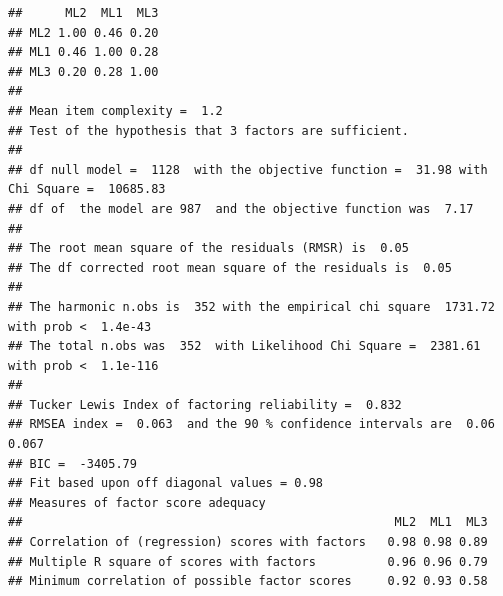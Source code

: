\documentclass[
  man]{apa6}
\begin{document}
\begin{verbatim}
##      ML2  ML1  ML3
## ML2 1.00 0.46 0.20
## ML1 0.46 1.00 0.28
## ML3 0.20 0.28 1.00
## 
## Mean item complexity =  1.2
## Test of the hypothesis that 3 factors are sufficient.
## 
## df null model =  1128  with the objective function =  31.98 with Chi Square =  10685.83
## df of  the model are 987  and the objective function was  7.17 
## 
## The root mean square of the residuals (RMSR) is  0.05 
## The df corrected root mean square of the residuals is  0.05 
## 
## The harmonic n.obs is  352 with the empirical chi square  1731.72  with prob <  1.4e-43 
## The total n.obs was  352  with Likelihood Chi Square =  2381.61  with prob <  1.1e-116 
## 
## Tucker Lewis Index of factoring reliability =  0.832
## RMSEA index =  0.063  and the 90 % confidence intervals are  0.06 0.067
## BIC =  -3405.79
## Fit based upon off diagonal values = 0.98
## Measures of factor score adequacy             
##                                                    ML2  ML1  ML3
## Correlation of (regression) scores with factors   0.98 0.98 0.89
## Multiple R square of scores with factors          0.96 0.96 0.79
## Minimum correlation of possible factor scores     0.92 0.93 0.58
\end{verbatim}
\end{document}
